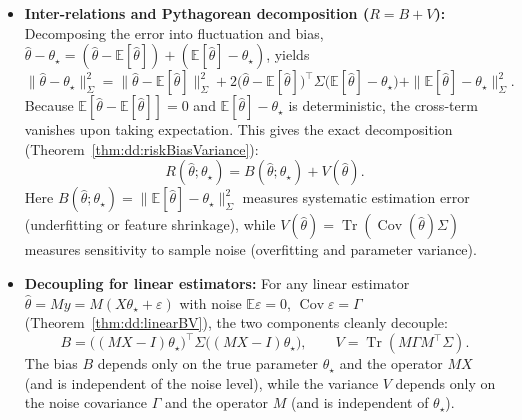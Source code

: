 \begin{remark}
\begin{itemize}
  \item \textbf{Inter-relations and Pythagorean decomposition ($R = B + V$):}
  Decomposing the error into fluctuation and bias, $\hat\theta-\theta_\star=(\hat\theta-\mathbb E[\hat\theta])+(\mathbb E[\hat\theta]-\theta_\star)$, yields
  \[
    \|\hat\theta-\theta_\star\|_\Sigma^2 = \|\hat\theta-\mathbb E[\hat\theta]\|_\Sigma^2 + 2\bigl(\hat\theta-\mathbb E[\hat\theta]\bigr)^\top\Sigma\bigl(\mathbb E[\hat\theta]-\theta_\star\bigr) + \|\mathbb E[\hat\theta]-\theta_\star\|_\Sigma^2.
  \]
  Because $\mathbb E[\hat\theta-\mathbb E[\hat\theta]]=0$ and $\mathbb E[\hat\theta]-\theta_\star$ is deterministic, the cross-term vanishes upon taking expectation. This gives the exact decomposition (Theorem~\ref{thm:dd:riskBiasVariance}):
  \[
    R(\hat\theta;\theta_\star) = B(\hat\theta;\theta_\star) + V(\hat\theta).
  \]
  Here $B(\hat\theta;\theta_\star)=\|\mathbb E[\hat\theta]-\theta_\star\|_\Sigma^2$ measures systematic estimation error (underfitting or feature shrinkage), while $V(\hat\theta)=\operatorname{Tr}(\operatorname{Cov}(\hat\theta)\Sigma)$ measures sensitivity to sample noise (overfitting and parameter variance).

  \item \textbf{Decoupling for linear estimators:}
  For any linear estimator $\hat\theta=My=M(X\theta_\star+\varepsilon)$ with noise $\mathbb E\varepsilon=0$, $\operatorname{Cov}\varepsilon=\Gamma$ (Theorem~\ref{thm:dd:linearBV}), the two components cleanly decouple:
  \[
    B = \bigl((MX-I)\theta_\star\bigr)^\top\Sigma\bigl((MX-I)\theta_\star\bigr), \qquad V = \operatorname{Tr}(M\Gamma M^\top\Sigma).
  \]
  The bias $B$ depends only on the true parameter $\theta_\star$ and the operator $MX$ (and is independent of the noise level), while the variance $V$ depends only on the noise covariance $\Gamma$ and the operator $M$ (and is independent of $\theta_\star$).
\end{itemize}
\end{remark}

